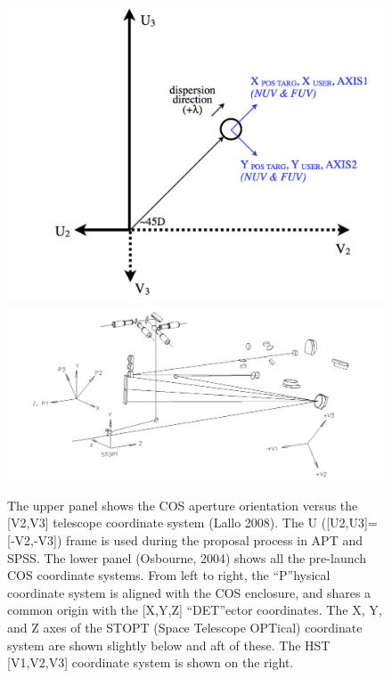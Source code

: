 \begin{figure}[htb]
\begin{center}
\noindent\includegraphics*[width=0.7\linewidth]{png/ADXD_V23.png}
\noindent\includegraphics*[width=0.795\linewidth]{pdf/COS_COORDS.pdf}
\end{center}
\caption[COS Aperture Orientation]{The upper panel shows the COS aperture orientation versus the [V2,V3] telescope coordinate system (Lallo 2008).
The U ([U2,U3]=[-V2,-V3]) frame is used during the proposal process in APT and SPSS. The lower panel (Osbourne, 2004) shows all the pre-launch COS coordinate
systems. From left to right, the ``P''hysical coordinate system is aligned with
the COS enclosure, and shares a common origin with the [X,Y,Z] ``DET''ector coordinates.
The X, Y, and Z axes of the STOPT (Space Telescope OPTical) coordinate system are shown slightly below and aft of these.
The HST [V1,V2,V3] coordinate system is shown on the right.\label{fig:ADXDV23}}
\end{figure}


